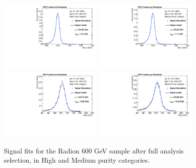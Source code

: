 \begin{figure}[h]
  \centering
  \includegraphics[width=0.45\textwidth]{figures/sec-signals/Rad600_signal_fit_mgg_cat0}\hfil
  \includegraphics[width=0.45\textwidth]{figures/sec-signals/Rad600_signal_fit_mgg_cat1}\hfil
  \includegraphics[width=0.45\textwidth]{figures/sec-signals/Rad600_signal_fit_mjj_cat0}\hfil
  \includegraphics[width=0.45\textwidth]{figures/sec-signals/Rad600_signal_fit_mjj_cat1}\hfil
  \caption{Signal fits for the Radion 600 GeV sample after full analysis selection, in High and Medium purity categories.}
  \label{fig:rad600}
\end{figure}

